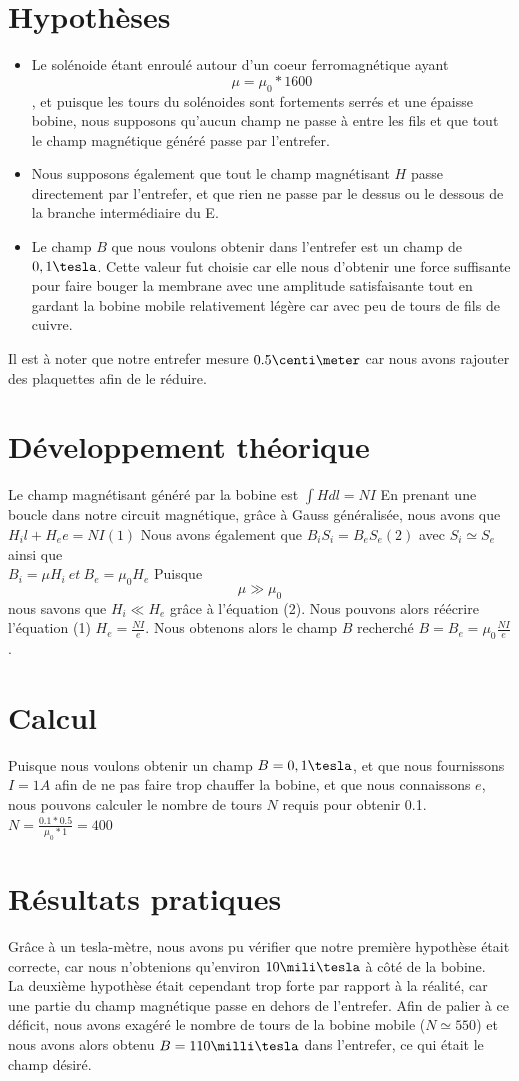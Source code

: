 \section{Hypothèses}
\begin{itemize}
\item Le solénoide étant enroulé autour d'un coeur ferromagnétique ayant \[\mu = \mu_0 * 1600\], et puisque les 
tours du solénoides sont fortements serrés et une épaisse bobine, nous supposons qu'aucun champ ne passe 
à entre les fils et que tout le champ magnétique généré passe par l'entrefer.\\
\item Nous supposons également que tout le champ magnétisant $H$ passe directement par l'entrefer, et que rien ne passe par 
le dessus ou le dessous de la branche intermédiaire du E.
\item Le champ $B$ que nous voulons obtenir dans l'entrefer est un champ de $0,1\tesla$. Cette valeur fut choisie car elle nous 
d'obtenir une force suffisante pour faire bouger la membrane avec une amplitude satisfaisante tout en gardant la bobine 
mobile relativement légère car avec peu de tours de fils de cuivre.
\end{itemize}
Il est à noter que notre entrefer mesure $0.5\centi\meter$ car nous avons rajouter des plaquettes afin de le réduire.
\section{Développement théorique}
Le champ magnétisant généré par la bobine est 
$\int{H dl} = N I$
En prenant une boucle dans notre circuit magnétique, grâce à Gauss généralisée, nous avons que
$H_i l + H_e e = N I (1)$
Nous avons également que $B_i S_i = B_e S_e (2)$  avec $S_i \simeq S_e$
ainsi que \\
$B_i = \mu H_i \:et\:  B_e = \mu_0 H_e$
Puisque \[\mu \gg \mu_0\]nous savons que $H_i \ll H_e$ grâce à l'équation (2).
Nous pouvons alors réécrire l'équation (1) $H_e = \frac{N I}{e}$.
Nous obtenons alors le champ $B$ recherché $B = B_e = \mu_0 \frac{N I}{e}$.
\section{Calcul}
Puisque nous voulons obtenir un champ $B = 0,1 \tesla$, et que nous fournissons $I = 1 A$ afin de ne pas faire trop 
chauffer la bobine, et que nous connaissons $e$, nous pouvons calculer le nombre de tours $N$ requis pour obtenir 0.1\tesla.
$N = \frac{0.1 * 0.5}{\mu_0 * 1} = 400$
\section{Résultats pratiques}
Grâce à un tesla-mètre, nous avons pu vérifier que notre première hypothèse était correcte, car nous n'obtenions 
qu'environ $10 \mili\tesla$ à côté de la bobine. 
\\La deuxième hypothèse était cependant trop forte par rapport à la réalité, car une 
partie du champ magnétique passe en dehors de l'entrefer. Afin de palier à ce déficit, nous avons exagéré le nombre de 
tours de la bobine mobile ($N \simeq 550$) et nous avons alors obtenu $B = 110 \milli\tesla$ dans l'entrefer, 
ce qui était le champ désiré.
